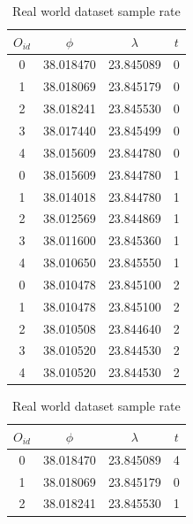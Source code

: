 \begin{table}
    \centering
    \begin{minipage}{0.5\textwidth}
        \centering
        \caption{Ideal dataset sample rate}
        \label{tbl:ideal_rate}
        \begin{tabular}{c c c c}
            \toprule
            \textbf{$O_{id}$} & \textbf{$\phi$} & \textbf{$\lambda$} & \textbf{$t$} \\
            \toprule
            0 & 38.018470 & 23.845089 & 0 \\
            1 & 38.018069 & 23.845179 & 0 \\
            2 & 38.018241 & 23.845530 & 0 \\
            3 & 38.017440 & 23.845499 & 0 \\
            4 & 38.015609 & 23.844780 & 0 \\
            \bottomrule
            0 & 38.015609 & 23.844780 & 1 \\
            1 & 38.014018 & 23.844780 & 1 \\
            2 & 38.012569 & 23.844869 & 1 \\
            3 & 38.011600 & 23.845360 & 1 \\
            4 & 38.010650 & 23.845550 & 1 \\
            \bottomrule
            0 & 38.010478 & 23.845100 & 2 \\
            1 & 38.010478 & 23.845100 & 2 \\
            2 & 38.010508 & 23.844640 & 2 \\
            3 & 38.010520 & 23.844530 & 2 \\
            4 & 38.010520 & 23.844530 & 2 \\
            \bottomrule
        \end{tabular}
    \end{minipage}%
    \hfill
    \begin{minipage}{0.5\textwidth}
        \centering
        \caption{Real world dataset sample rate}
        \label{tbl:real_rate}
        \begin{tabular}{c c c c}
            \toprule
            \textbf{$O_{id}$} & \textbf{$\phi$} & \textbf{$\lambda$} & \textbf{$t$} \\
            \toprule
            0 & 38.018470 & 23.845089 & 4 \\
            1 & 38.018069 & 23.845179 & 0 \\
            2 & 38.018241 & 23.845530 & 1 \\

\end{tabular}
\end{minipage}
\end{table}
